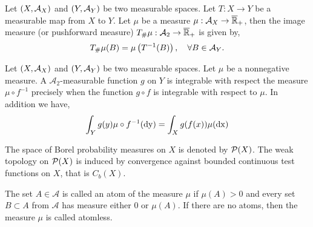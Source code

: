 \begin{definition}
	Let $\left( X, \mathcal{A}_X \right)$  and $\left( Y, \mathcal{A}_Y \right)$ be two measurable spaces. Let $T:X\rightarrow Y$ be a measurable map from $X$ to $Y$. Let $\mu$ be a measure $\mu: \mathcal{A}_X\rightarrow \overline{\mathbb{R}}_+$, then the image measure (or pushforward measure) ${T}_{\#} \mu:\mathcal{A}_2\rightarrow \overline{\mathbb{R}}_+$ is given by,
	\begin{equation*}
		{T}_{\#} \mu(B) = \mu\left( T^{-1}(B) \right), \quad \forall B \in \mathcal{A}_Y.
	\end{equation*}
\end{definition}


\begin{theorem}
	Let $\left( X, \mathcal{A}_X \right)$  and $\left( Y, \mathcal{A}_Y \right)$ be two measurable spaces. Let $\mu$ be a nonnegative measure. A $\mathcal{A}_2$-measurable function $g$ on $Y$ is integrable with respect the measure $\mu\circ f^{-1}$ precisely when the function $g\circ f$ is integrable with respect to $\mu$. In addition we have, 
	\begin{equation*}
		\int_Y g(y)\mu\circ f^{-1}(\mathrm{dy}) = \int_X g(f(x))\mu(\mathrm{dx})
	\end{equation*}
\end{theorem}

The space of Borel probability measures on $X$ is denoted by $\mathcal{P}(X)$. The weak topology on $\mathcal{P}(X)$ is induced by convergence against bounded continuous test functions on $X$, that is $C_b(X)$.

\begin{definition}
	The set $A \in \mathcal A$ is called an atom of the measure $\mu$
	if $\mu(A) > 0$ and every set $B \subset A$ from $\mathcal A$ has measure either $0$ or $\mu(A)$. If there are no atoms, then the measure $\mu$ is called atomless. 
\end{definition}

